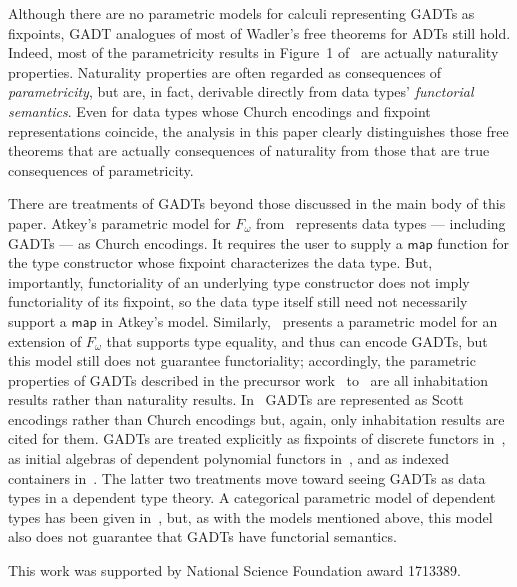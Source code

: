 \documentclass[submission,copyright,creativecommons]{eptcs}
\begin{document}
Although there are no parametric models for calculi representing GADTs
as fixpoints, GADT analogues of most of Wadler's free theorems for
ADTs still hold.
Indeed, most of the parametricity results in Figure~1 of~\cite{wad89}
are actually naturality properties.
Naturality properties are often regarded as consequences of {\em
  parametricity}, but are, in fact, derivable directly from data
types' {\em functorial semantics}. Even for data types whose Church
encodings and fixpoint representations coincide, the analysis in this
paper clearly distinguishes those free theorems that are actually
consequences of naturality from those that are true consequences of
parametricity.


There are treatments of GADTs beyond those discussed in the main body
of this paper.  Atkey's parametric model for $F_\omega$
from~\cite{atk12} represents data types --- including GADTs --- as
Church encodings. It requires the user to supply a $\mathsf{map}$
function for the type constructor whose fixpoint characterizes the
data type. But, importantly, functoriality of an underlying type
constructor does not imply functoriality of its fixpoint, so the data
type itself still need not necessarily support a $\mathsf{map}$ in
Atkey's model. Similarly,~\cite{vw10} presents a parametric model for
an extension of $F_\omega$ that supports type equality, and thus can
encode GADTs, but this model still does not guarantee functoriality;
accordingly, the parametric properties of GADTs described in the
precursor work~\cite{vw06} to~\cite{vw10} are all inhabitation results
rather than naturality results. In~\cite{ms09} GADTs are represented
as Scott encodings rather than Church encodings but, again, only
inhabitation results are cited for them. GADTs are treated explicitly
as fixpoints of discrete functors in~\cite{jg08}, as initial algebras
of dependent polynomial functors in~\cite{gh03,hf11}, and as indexed
containers in~\cite{ma09}. The latter two treatments move toward
seeing GADTs as data types in a dependent type theory. A categorical
parametric model of dependent types has been given in~\cite{agj14},
but, as with the models mentioned above, this model also does not
guarantee that GADTs have functorial semantics.

\vspace*{0.2in}

 This work was supported by National
Science Foundation award 1713389.



\end{document}
